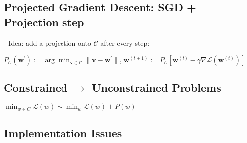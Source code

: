 \subsection*{Projected Gradient Descent: SGD + Projection step}


- Idea: add a projection onto $\mathcal{C}$ after every step:

$
P_{\mathcal{C}}(\mathbf{w}^{\prime}):=\arg \min _{\mathbf{v} \in \mathcal{C}}\|\mathbf{v}-\mathbf{w}^{\prime}\|
$, 
$
\mathbf{w}^{(t+1)}:=P_{\mathcal{C}}[\mathbf{w}^{(t)}-\gamma \nabla \mathcal{L}(\mathbf{w}^{(t)})]
$


\subsection*{Constrained $\rightarrow$ Unconstrained Problems}

$\min_{w\in C}\mathcal{L}(w)\sim\min_{w}\mathcal{L}(w)+P(w)$








\subsection*{Implementation Issues}

